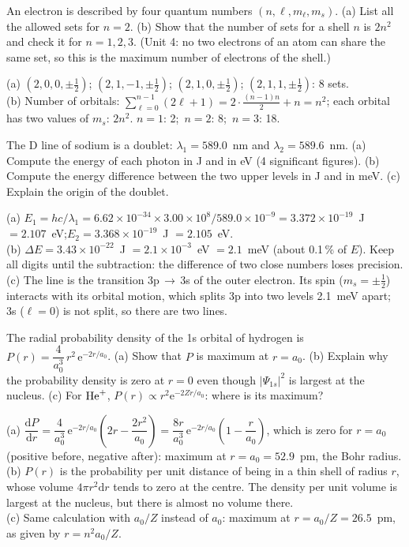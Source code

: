 An electron is described by four quantum numbers $(n, \ell, m_\ell, m_s)$. (a) List all the allowed
sets for $n = 2$. (b) Show that the number of sets for a shell $n$ is $2n^2$ and check it for
$n = 1, 2, 3$. (Unit 4: no two electrons of an atom can share the same set, so this is the maximum
number of electrons of the shell.)
\begin{solution}
(a) $(2,0,0,\pm\frac12)$; $(2,1,-1,\pm\frac12)$; $(2,1,0,\pm\frac12)$; $(2,1,1,\pm\frac12)$: 8 sets.\\
(b) Number of orbitals: $\sum_{\ell=0}^{n-1}(2\ell+1) = 2\cdot\frac{(n-1)n}{2} + n = n^2$; each
orbital has two values of $m_s$: $2n^2$. $n = 1$: 2;\ $n = 2$: 8;\ $n = 3$: 18.
\end{solution}

The D line of sodium is a doublet: $\lambda_1 = 589.0$~nm and $\lambda_2 = 589.6$~nm. (a) Compute the
energy of each photon in J and in eV (4 significant figures). (b) Compute the energy difference
between the two upper levels in J and in meV. (c) Explain the origin of the doublet.
\begin{solution}
(a) $E_1 = hc/\lambda_1 = 6.62\times10^{-34}\times3.00\times10^8/589.0\times10^{-9} = 3.372\times10^{-19}$~J
$= 2.107$~eV;\quad $E_2 = 3.368\times10^{-19}$~J $= 2.105$~eV.\\
(b) $\Delta E = 3.43\times10^{-22}$~J $= 2.1\times10^{-3}$~eV $= 2.1$~meV (about 0.1\,\% of $E$). Keep
all digits until the subtraction: the difference of two close numbers loses precision.\\
(c) The line is the transition 3p$\,\to\,$3s of the outer electron. Its spin ($m_s = \pm\frac12$)
interacts with its orbital motion, which splits 3p into two levels 2.1~meV apart; 3s ($\ell = 0$) is not
split, so there are two lines.
\end{solution}

The radial probability density of the 1s orbital of hydrogen is
$P(r) = \dfrac{4}{a_0^3}\,r^2\,\mathrm e^{-2r/a_0}$. (a) Show that $P$ is maximum at $r = a_0$.
(b) Explain why the probability density is zero at $r = 0$ even though $|\Psi_{1s}|^2$ is largest
at the nucleus. (c) For $\ce{He+}$, $P(r) \propto r^2\mathrm e^{-2Zr/a_0}$: where is its maximum?
\begin{solution}
(a) $\dfrac{\mathrm dP}{\mathrm dr} = \dfrac4{a_0^3}\,\mathrm e^{-2r/a_0}\left(2r - \dfrac{2r^2}{a_0}\right)
= \dfrac{8r}{a_0^3}\,\mathrm e^{-2r/a_0}\left(1 - \dfrac r{a_0}\right)$, which is zero for $r = a_0$
(positive before, negative after): maximum at $r = a_0 = 52.9$~pm, the Bohr radius.\\
(b) $P(r)$ is the probability per unit distance of being in a thin shell of radius $r$, whose volume
$4\pi r^2\mathrm dr$ tends to zero at the centre. The density per unit volume is largest at the nucleus,
but there is almost no volume there.\\
(c) Same calculation with $a_0/Z$ instead of $a_0$: maximum at $r = a_0/Z = 26.5$~pm, as given by
$r = n^2a_0/Z$.
\end{solution}
